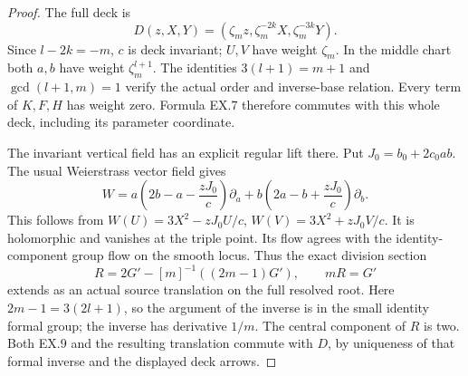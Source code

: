 \begin{proof}
The full deck is
\[
 D(z,X,Y)=(\zeta_mz,\zeta_m^{-2k}X,\zeta_m^{-3k}Y).
\]
Since \(l-2k=-m\), \(c\) is deck invariant; \(U,V\) have
weight \(\zeta_m\). In the middle chart both \(a,b\) have
weight \(\zeta_m^{l+1}\). The identities
\(3(l+1)=m+1\) and \(\gcd(l+1,m)=1\) verify the actual
order and inverse-base relation. Every term of \(K,F,H\) has
weight zero. Formula EX.7 therefore commutes with this whole
deck, including its parameter coordinate.

The invariant vertical field has an explicit regular lift there.
Put \(J_0=b_0+2c_0ab\). The usual Weierstrass vector field gives
\[
 W=a\left(2b-a-\frac{zJ_0}{c}\right)\partial_a
   +b\left(2a-b+\frac{zJ_0}{c}\right)\partial_b.
 \tag{EX.8}
\]
This follows from
\(W(U)=3X^2-zJ_0U/c\), \(W(V)=3X^2+zJ_0V/c\).
It is holomorphic and vanishes at the triple point. Its flow
agrees with the identity-component group flow on the smooth
locus. Thus the exact division section
\[
 R=2G'-[m]^{-1}((2m-1)G'),\qquad mR=G'
 \tag{EX.9}
\]
extends as an actual source translation on the full resolved
root. Here \(2m-1=3(2l+1)\), so the argument of the inverse is
in the small identity formal group; the inverse has derivative
\(1/m\). The central component of \(R\) is two. Both EX.9
and the resulting translation commute with \(D\), by uniqueness
of that formal inverse and the displayed deck arrows.


\end{proof}

